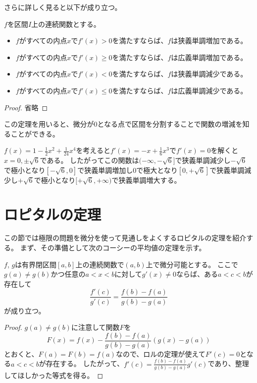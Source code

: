 さらに詳しく見ると以下が成り立つ。

\begin{theorem}
$f$を区間$I$上の連続関数とする。
\begin{itemize}
\item
$f$がすべての内点$x$で$f'(x) > 0$を満たすならば、$f$は狭義単調増加である。
\item
$f$がすべての内点$x$で$f'(x) \ge 0$を満たすならば、$f$は広義単調増加である。
\item
$f$がすべての内点$x$で$f'(x) < 0$を満たすならば、$f$は狭義単調減少である。
\item
$f$がすべての内点$x$で$f'(x) \le 0$を満たすならば、$f$は広義単調減少である。
\end{itemize}
\end{theorem}

\begin{proof}
省略
\end{proof}

この定理を用いると、微分が$0$となる点で区間を分割することで関数の増減を知ることができる。

\begin{example}
$f(x) = 1-\frac{1}{2}x^2+\frac{1}{24}x^4$を考えると$f'(x) = -x+\frac{1}{6}x^3$で$f'(x) = 0$を解くと$x = 0, \pm\sqrt{6}$である。
したがってこの関数は$(-\infty, -\sqrt{6}]$で狭義単調減少し$-\sqrt{6}$で極小となり$[-\sqrt{6}, 0]$で狭義単調増加し$0$で極大となり$[0, +\sqrt{6}]$で狭義単調減少し$+\sqrt{6}$で極小となり$[+\sqrt{6}, +\infty)$で狭義単調増大する。
\end{example}

\section{ロピタルの定理}

この節では極限の問題を微分を使って見通しをよくするロピタルの定理を紹介する。
まず、その準備として次のコーシーの平均値の定理を示す。

\begin{theorem}[コーシーの平均値の定理]
$f$, $g$は有界閉区間$[a, b]$上の連続関数で$(a, b)$上で微分可能とする。
ここで$g(a) \ne g(b)$かつ任意の$a < x < b$に対して$g'(x) \ne 0$ならば、ある$a < c < b$が存在して
$$
\frac{f'(c)}{g'(c)} = \frac{f(b)-f(a)}{g(b)-g(a)}
$$
が成り立つ。
\end{theorem}

\begin{proof}
$g(a) \ne g(b)$に注意して関数$F$を
$$
F(x) = f(x)-\frac{f(b)-f(a)}{g(b)-g(a)}(g(x)-g(a))
$$
とおくと、$F(a) = F(b) = f(a)$なので、ロルの定理が使えて$F'(c) = 0$となる$a < c < b$が存在する。
したがって、$f'(c) = \frac{f(b)-f(a)}{g(b)-g(a)}g'(c)$であり、整理してほしかった等式を得る。
\end{proof}

